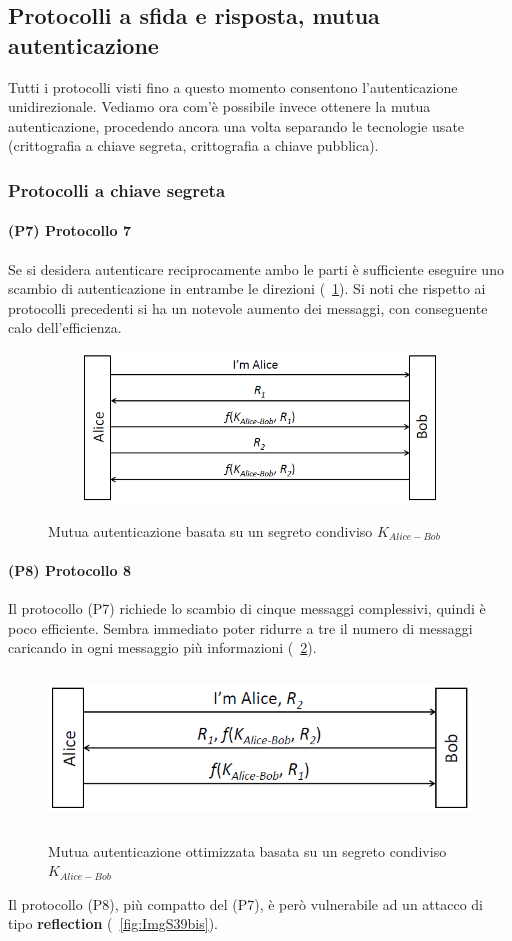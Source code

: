 \subsection{Protocolli a sfida e risposta, mutua autenticazione} \label{par:aut_prot_mut_aut}
Tutti i protocolli visti fino a questo momento consentono l'autenticazione unidirezionale. Vediamo ora com'è possibile invece ottenere la mutua autenticazione, procedendo ancora una volta separando le tecnologie usate (crittografia a chiave segreta, crittografia a chiave pubblica).
\subsubsection{Protocolli a chiave segreta}
\paragraph{(P7) Protocollo 7}
Se si desidera autenticare reciprocamente ambo le parti è sufficiente eseguire uno scambio di autenticazione in
entrambe le direzioni (\figurename~\ref{fig:ImgS35bis}). Si noti che rispetto ai protocolli precedenti si ha un notevole aumento dei messaggi, con conseguente calo dell'efficienza.
\begin{figure}[htbp]
	\centering%
	\subfigure%
	{\includegraphics[height=4cm, width=12cm, keepaspectratio]{Immagini/autenticazione/ImgS35bis.png}}
	\caption{Mutua autenticazione basata su un segreto condiviso $K_{Alice-Bob}$}\label{fig:ImgS35bis} 	
\end{figure}
\paragraph{(P8) Protocollo 8}
Il protocollo (P7) richiede lo scambio di cinque messaggi complessivi, quindi è poco efficiente. Sembra immediato poter ridurre a tre il numero di messaggi caricando in ogni messaggio più informazioni (\figurename~\ref{fig:ImgS36bis}).
\begin{figure}[htbp]
	\centering%
	\subfigure%
	{\includegraphics[height=4cm, width=12cm, keepaspectratio]{Immagini/autenticazione/ImgS36bis.png}}
	\caption{Mutua autenticazione ottimizzata basata su un segreto condiviso $K_{Alice-Bob}$}\label{fig:ImgS36bis} 	
\end{figure}
Il protocollo (P8), più compatto del (P7), è però vulnerabile ad un attacco di tipo \textbf{reflection} (\figurename~\ref{fig:ImgS39bis}). 

